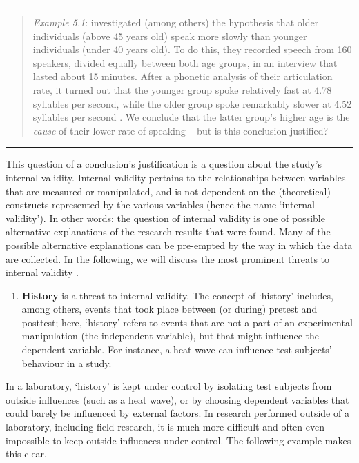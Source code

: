 \documentclass[
]{book}
\providecommand{\tightlist}{%
  \setlength{\itemsep}{0pt}\setlength{\parskip}{0pt}}
\begin{document}
\begin{center}\rule{0.5\linewidth}{0.5pt}\end{center}

\begin{quote}
\emph{Example 5.1}: \citet{Verh04} investigated (among others) the hypothesis that older individuals (above 45 years old) speak more slowly than younger individuals (under 40 years old). To do this, they recorded speech from 160 speakers, divided equally between both age groups, in an interview that lasted about 15 minutes. After a phonetic analysis of their articulation rate, it turned out that the younger group spoke relatively fast at 4.78 syllables per second, while the older group spoke remarkably slower at 4.52 syllables per second \citep[p.302]{Verh04}. We conclude that the latter group's higher age is the \emph{cause} of their lower rate of speaking -- but is this conclusion justified?
\end{quote}

\begin{center}\rule{0.5\linewidth}{0.5pt}\end{center}

This question of a conclusion's justification is a question about the study's internal validity. Internal validity pertains to the relationships between variables that are measured or manipulated, and is not dependent on the (theoretical) constructs represented by the various variables (hence the name `internal validity'). In other words: the question of internal validity is one of possible alternative explanations of the research results that were found. Many of the possible alternative explanations can be pre-empted by the way in which the data are collected. In the following, we will discuss the most prominent threats to internal validity \citep{SCC02}.

\begin{enumerate}
\def\labelenumi{\arabic{enumi}.}
\tightlist
\item
  \textbf{History} is a threat to internal validity. The concept of `history' includes, among others, events that took place between (or during) pretest and posttest; here, `history' refers to events that are not a part of an experimental manipulation (the independent variable), but that might influence the dependent variable. For instance, a heat wave can influence test subjects' behaviour in a study.
\end{enumerate}

In a laboratory, `history' is kept under control by isolating test subjects from outside influences (such as a heat wave), or by choosing dependent variables that could barely be influenced by external factors. In research performed outside of a laboratory, including field research, it is much more difficult and often even impossible to keep outside influences under control. The following example makes this clear.
\end{document}
